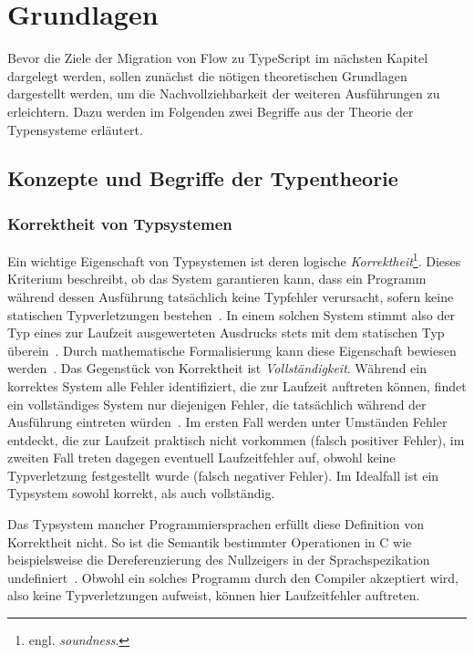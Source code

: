\chapter{Grundlagen}
\label{chap:basics}

Bevor die Ziele der Migration von Flow zu TypeScript im nächsten Kapitel dargelegt werden, sollen zunächst die nötigen theoretischen Grundlagen dargestellt werden, um die Nachvollziehbarkeit der weiteren Ausführungen zu erleichtern. Dazu werden im Folgenden zwei Begriffe aus der Theorie der Typensysteme erläutert.

\section{Konzepte und Begriffe der Typentheorie}

\subsection{Korrektheit von Typsystemen}
Ein wichtige Eigenschaft von Typsystemen ist deren logische \textit{Korrektheit}\footnote{engl. \textit{soundness}.}. Dieses Kriterium beschreibt, ob das System garantieren kann, dass ein Programm während dessen Ausführung tatsächlich keine Typfehler verursacht, sofern keine statischen Typverletzungen bestehen~\autocite{WRIGHT:1994}. In einem solchen System stimmt also der Typ eines zur Laufzeit ausgewerteten Ausdrucks stets mit dem statischen Typ überein~\autocite{DART:TYPE_SYSTEM}. Durch mathematische Formalisierung kann diese Eigenschaft bewiesen werden~\autocite[7]{CARDELLI:TYPE_SYSTEMS}. Das Gegenstück von Korrektheit ist \textit{Vollständigkeit}. Während ein korrektes System alle Fehler identifiziert, die zur Laufzeit auftreten können, findet ein vollständiges System nur diejenigen Fehler, die tatsächlich während der Ausführung eintreten würden~\autocite{FLOW:TYPES_AND_EXPRESSIONS}. Im ersten Fall werden unter Umständen Fehler entdeckt, die zur Laufzeit praktisch nicht vorkommen (falsch positiver Fehler), im zweiten Fall treten dagegen eventuell Laufzeitfehler auf, obwohl keine Typverletzung festgestellt wurde (falsch negativer Fehler). Im Idealfall ist ein Typsystem sowohl korrekt, als auch vollständig.

Das Typsystem mancher Programmiersprachen erfüllt diese Definition von Korrektheit nicht. So ist die Semantik bestimmter Operationen in C wie beispielsweise die Dereferenzierung des Nullzeigers in der Sprachspezikation undefiniert~\autocite[79]{ISO:C99}. Obwohl ein solches Programm durch den Compiler akzeptiert wird, also keine Typverletzungen aufweist, können hier Laufzeitfehler auftreten.

